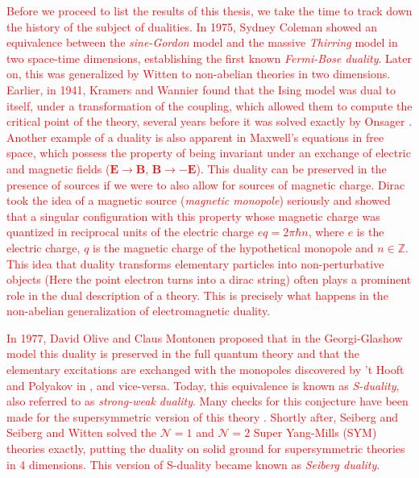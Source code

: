 \textcolor{red}{Before we proceed to list the results of this thesis, we take the time to track down the history of the subject of dualities. In 1975, Sydney Coleman \cite{Coleman:1974bu} showed an equivalence between the \textit{sine-Gordon} model and the massive \textit{Thirring} model in two space-time dimensions, establishing the first known \textit{Fermi-Bose duality}. Later on, this was generalized by Witten \cite{Witten:1983ar} to non-abelian theories in two dimensions. Earlier, in 1941, Kramers and Wannier \cite{Kramers:1941kn} found that the Ising model was dual to itself, under a transformation of the coupling, which allowed them to compute the critical point of the theory, several years before it was solved exactly by Onsager \cite{Onsager:1943jn}. Another example of a duality is also apparent in Maxwell's equations in free space, which possess the property of being invariant under an exchange of electric and magnetic fields ($\bm{E}\rightarrow \bm{B}$, $\bm{B}\rightarrow -\bm{E}$). This duality can be preserved in the presence of sources if we were to also allow for sources of magnetic charge. Dirac took the idea of a magnetic source (\textit{magnetic monopole}) seriously and showed that a singular configuration with this property whose magnetic charge was quantized in reciprocal units of the electric charge \cite{Dirac:1931kp} $eq = 2\pi \hbar n$, where $e$ is the electric charge, $q$ is the magnetic charge of the hypothetical monopole and $n \in \mathbb{Z}$. This idea that duality transforms elementary particles into non-perturbative objects (Here the point electron turns into a dirac string) often plays a prominent role in the dual description of a theory. This is precisely what happens in the non-abelian generalization of electromagnetic duality.}


\textcolor{red}{In 1977, David Olive and Claus Montonen \cite{Montonen:1977sn} proposed that in the Georgi-Glashow model this duality is preserved in the full quantum theory and that the elementary excitations are exchanged with the monopoles discovered by 't Hooft and Polyakov in \cite{Polyakov:1974ek, tHooft:1974kcl}, and vice-versa. Today, this equivalence is known as \textit{S-duality}, also referred to as \textit{strong-weak duality}. Many checks for this conjecture have been made for the supersymmetric version of this theory \cite{Osborn:1979tq, Witten:1978mh, Sen:1994yi, Vafa:1994tf}. Shortly after, Seiberg \cite{Seiberg:1994bz} and Seiberg and Witten \cite{Seiberg:1994rs} solved the $\mathcal{N}=1$ and $\mathcal{N}=2$ Super Yang-Mills (SYM) theories exactly, putting the duality on solid ground for supersymmetric theories in 4 dimensions. This version of S-duality became known as \textit{Seiberg duality}.}

